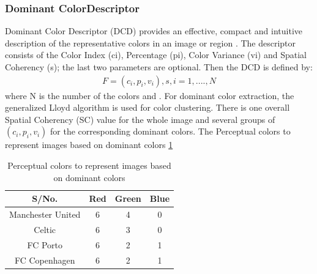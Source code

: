 \subsubsection {Dominant ColorDescriptor}
Dominant Color Descriptor  (DCD) provides an effective, 
compact  and  intuitive  description  of  the  representative 
colors  in  an  image or  region  . The descriptor  consists 
of  the  Color  Index  (ci),  Percentage  (pi),  Color Variance 
(vi) and Spatial Coherency (s); the last two parameters are 
optional.  Then the DCD is defined by: 
\begin{align}
F={(c_{i},p_{i},v_{i}),s}, i=1,....,N
\end{align} 
where N is the number of the colors and                      . 
For dominant  color  extraction,  the  generalized Lloyd 
algorithm  is  used  for  color  clustering. 
There is one overall Spatial Coherency (SC) value for the 
whole  image  and  several  groups  of $(c_{i},  p_{i},  v_{i}) $  for  the 
corresponding dominant colors. The  Perceptual  colors  to  represent  images  based  on  dominant colors  \ref{DCD}
\begin{table}[h]
\begin{tabular}{| c | c | c |c |}
\hline
S/No.              & Red &Green &Blue   \\
\hline
Manchester United & 6 & 4 & 0   \\
Celtic            & 6 & 3 & 0    \\
FC Porto           & 6 & 2 & 1   \\
FC Copenhagen     & 6 & 2 & 1  \\
\end{tabular}
\caption{ Perceptual  colors  to  represent  images  based  on  dominant colors }
  \label{DCD}

\end{table}
